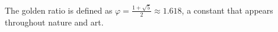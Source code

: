 \documentclass{article}
\begin{document}
The golden ratio is defined as $\varphi = \frac{1+\sqrt{5}}{2} \approx
1.618$, a constant that appears throughout nature and art.
\end{document}
